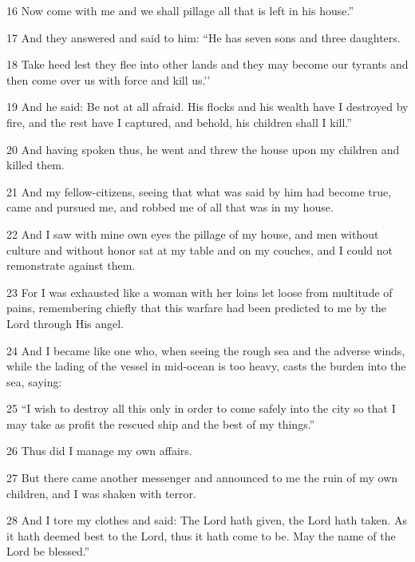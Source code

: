 \par 16 Now come with me and we shall pillage all that is left in his house.”

\par 17 And they answered and said to him: “He has seven sons and three daughters.

\par 18 Take heed lest they flee into other lands and they may become our tyrants and then come over us with force and kill us.’’

\par 19 And he said: Be not at all afraid. His flocks and his wealth have I destroyed by fire, and the rest have I captured, and behold, his children shall I kill.”

\par 20 And having spoken thus, he went and threw the house upon my children and killed them.

\par 21 And my fellow-citizens, seeing that what was said by him had become true, came and pursued me, and robbed me of all that was in my house.

\par 22 And I saw with mine own eyes the pillage of my house, and men without culture and without honor sat at my table and on my couches, and I could not remonstrate against them.

\par 23 For I was exhausted like a woman with her loins let loose from multitude of pains, remembering chiefly that this warfare had been predicted to me by the Lord through His angel.

\par 24 And I became like one who, when seeing the rough sea and the adverse winds, while the lading of the vessel in mid-ocean is too heavy, casts the burden into the sea, saying:

\par 25 “I wish to destroy all this only in order to come safely into the city so that I may take as profit the rescued ship and the best of my things.”

\par 26 Thus did I manage my own affairs.

\par 27 But there came another messenger and announced to me the ruin of my own children, and I was shaken with terror.

\par 28 And I tore my clothes and said: The Lord hath given, the Lord hath taken. As it hath deemed best to the Lord, thus it hath come to be. May the name of the Lord be blessed.”

